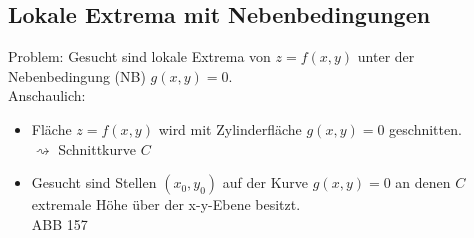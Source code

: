 \subsection{Lokale Extrema mit Nebenbedingungen}
Problem: Gesucht sind lokale Extrema von $z=f(x,y)$ unter der Nebenbedingung (NB) $g(x,y)=0$.\\
Anschaulich:
\begin{itemize}
\item Fläche $z=f(x,y)$ wird mit Zylinderfläche $g(x,y)=0$ geschnitten.\\
$\rightsquigarrow$ Schnittkurve $C$
\item Gesucht sind Stellen $(x_0,y_0)$ auf der Kurve $g(x,y)=0$ an denen $C$ extremale Höhe über der x-y-Ebene besitzt.\\
ABB 157
\end{itemize}

